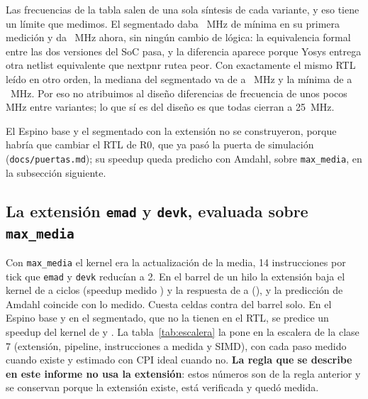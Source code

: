 \documentclass[11pt,a4paper]{article}
\newcommand{\tablaancha}[1]{\resizebox{\linewidth}{!}{}}
\newcommand{\arch}[1]{\texttt{#1}}
\begin{document}
\begin{table}[H]\centering
\caption{Métricas de cada variante con la regla de cotas.}\label{tab:variantes}
\tablaancha{generado/t33cvariantes.tex}
\end{table}

Las frecuencias de la tabla salen de una sola síntesis de cada variante, y eso tiene un límite que medimos. El segmentado daba \cifraFminSegPuno{}~MHz de mínima en su primera medición y da \cifraFminSeg{}~MHz ahora, sin ningún cambio de lógica: la equivalencia formal entre las dos versiones del SoC pasa, y la diferencia aparece porque Yosys entrega otra netlist equivalente que nextpnr rutea peor. Con exactamente el mismo RTL leído en otro orden, la mediana del segmentado va de \cifraSintMedMin{} a \cifraSintMedMax{}~MHz y la mínima de \cifraSintMinMin{} a \cifraSintMinMax{}~MHz. Por eso no atribuimos al diseño diferencias de frecuencia de unos pocos MHz entre variantes; lo que sí es del diseño es que todas cierran a 25~MHz.

El Espino base y el segmentado con la extensión no se construyeron, porque habría que cambiar el RTL de R0, que ya pasó la puerta de simulación (\arch{docs/puertas.md}); su speedup queda predicho con Amdahl, sobre \texttt{max\_media}, en la subsección siguiente.

\subsection{La extensión \texttt{emad} y \texttt{devk}, evaluada sobre \texttt{max\_media}}

Con \texttt{max\_media} el kernel era la actualización de la media, 14 instrucciones por tick que \texttt{emad} y \texttt{devk} reducían a 2. En el barrel de un hilo la extensión baja el kernel de \pSieteAmdahlCiclosPredKernelBarrel{} a \pSieteAmdahlCiclosPredKernelXdSobreBarrel{} ciclos (speedup medido \pSieteAmdahlMedKernelXdSobreBarrel) y la respuesta de \pSieteAmdahlCiclosPredRespBarrel{} a \pSieteAmdahlCiclosPredRespXdSobreBarrel{} (\pSieteAmdahlMedRespXdSobreBarrel), y la predicción de Amdahl coincide con lo medido. Cuesta \pSieteCeldasBarrelXd{} celdas contra \pSieteCeldasBarrel{} del barrel solo. En el Espino base y en el segmentado, que no la tienen en el RTL, se predice un speedup del kernel de \pSieteAmdahlPredKernelBaseXd{} y \pSieteAmdahlPredKernelSegXd. La tabla~\ref{tab:escalera} la pone en la escalera de la clase 7 (extensión, pipeline, instrucciones a medida y SIMD), con cada paso medido cuando existe y estimado con CPI ideal cuando no. \textbf{La regla que se describe en este informe no usa la extensión}: estos números son de la regla anterior y se conservan porque la extensión existe, está verificada y quedó medida.
\end{document}
